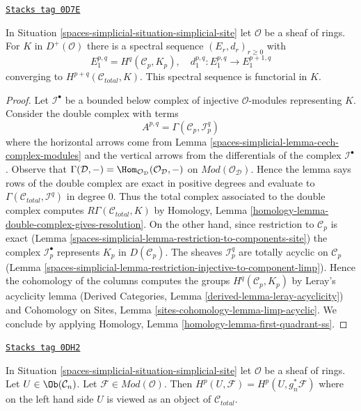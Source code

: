 \begin{lemma}
\label{spaces-simplicial-lemma-simplicial-module-cohomology-site}
\href{https://stacks.math.columbia.edu/tag/0D7E}{\texttt{Stacks tag 0D7E}}

In Situation \ref{spaces-simplicial-situation-simplicial-site} let $\mathcal{O}$
be a sheaf of rings. For $K$ in $D^+(\mathcal{O})$
there is a spectral sequence $(E_r, d_r)_{r \geq 0}$ with
$$
E_1^{p, q} = H^q(\mathcal{C}_p, K_p),\quad
d_1^{p, q} : E_1^{p, q} \to E_1^{p + 1, q}
$$
converging to $H^{p + q}(\mathcal{C}_{total}, K)$.
This spectral sequence is functorial in $K$.
\end{lemma}

\begin{proof}
Let $\mathcal{I}^\bullet$ be a bounded below complex of injective
$\mathcal{O}$-modules representing $K$. Consider the double complex with terms
$$
A^{p, q} = \Gamma(\mathcal{C}_p, \mathcal{I}^q_p)
$$
where the horizontal arrows come from
Lemma \ref{spaces-simplicial-lemma-cech-complex-modules}
and the vertical arrows from the differentials of the
complex $\mathcal{I}^\bullet$. Observe that
$\Gamma(\mathcal{D}, -) =
\Hom_{\mathcal{O}_\mathcal{D}}(\mathcal{O}_\mathcal{D}, -)$
on $\textit{Mod}(\mathcal{O}_\mathcal{D})$. Hence the lemma
says rows of the double complex are exact
in positive degrees and evaluate to
$\Gamma(\mathcal{C}_{total}, \mathcal{I}^q)$ in degree $0$.
Thus the total complex associated to the double complex
computes $R\Gamma(\mathcal{C}_{total}, K)$ by
Homology, Lemma \ref{homology-lemma-double-complex-gives-resolution}.
On the other hand, since restriction to $\mathcal{C}_p$ is exact
(Lemma \ref{spaces-simplicial-lemma-restriction-to-components-site})
the complex $\mathcal{I}_p^\bullet$ represents $K_p$ in
$D(\mathcal{C}_p)$. The sheaves $\mathcal{I}_p^q$
are totally acyclic on $\mathcal{C}_p$
(Lemma \ref{spaces-simplicial-lemma-restriction-injective-to-component-limp}).
Hence the cohomology of the columns computes the groups
$H^q(\mathcal{C}_p, K_p)$ by Leray's acyclicity lemma
(Derived Categories, Lemma \ref{derived-lemma-leray-acyclicity})
and
Cohomology on Sites, Lemma \ref{sites-cohomology-lemma-limp-acyclic}.
We conclude by applying
Homology, Lemma \ref{homology-lemma-first-quadrant-ss}.
\end{proof}

\begin{lemma}
\label{spaces-simplicial-lemma-sanity-check-modules}
\href{https://stacks.math.columbia.edu/tag/0DH2}{\texttt{Stacks tag 0DH2}}

In Situation \ref{spaces-simplicial-situation-simplicial-site} let $\mathcal{O}$
be a sheaf of rings. Let $U \in \Ob(\mathcal{C}_n)$. Let
$\mathcal{F} \in \textit{Mod}(\mathcal{O})$.
Then $H^p(U, \mathcal{F}) = H^p(U, g_n^*\mathcal{F})$
where on the left hand side $U$ is viewed as an object of
$\mathcal{C}_{total}$.
\end{lemma}

